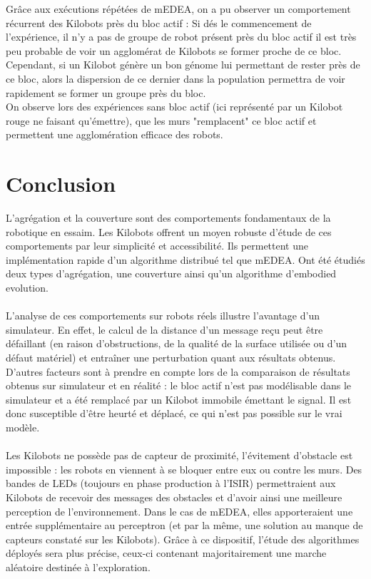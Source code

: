 \documentclass[a4paper]{article}
\begin{document}
Grâce aux exécutions répétées de mEDEA, on a pu observer un comportement récurrent des Kilobots près du bloc actif : Si dés le commencement de l'expérience, il n'y a pas de groupe de robot présent près du bloc actif  il est très peu probable de voir un agglomérat de Kilobots se former proche de ce bloc. Cependant, si un Kilobot génère un bon génome lui permettant de rester près de ce bloc, alors la dispersion de ce dernier dans la population permettra de voir rapidement se former un groupe près du bloc.\\
On observe lors des expériences sans bloc actif (ici représenté par un Kilobot rouge ne faisant qu'émettre), que les murs "remplacent" ce bloc actif et permettent une agglomération efficace des robots.
\newpage
\section{Conclusion}
L’agrégation et la couverture sont des comportements fondamentaux de la robotique en essaim. Les Kilobots offrent un moyen robuste d’étude de ces comportements par leur simplicité et accessibilité. Ils permettent une implémentation rapide d’un algorithme distribué tel que mEDEA. Ont été étudiés deux types d’agrégation, une couverture ainsi qu’un algorithme d’embodied evolution.
\\ \\
L’analyse de ces comportements sur robots réels illustre l’avantage d’un simulateur. En effet, le calcul de la distance d’un message reçu peut être défaillant (en raison d’obstructions, de la qualité de la surface utilisée ou d’un défaut matériel) et entraîner une perturbation quant aux résultats obtenus. D’autres facteurs sont à prendre en compte lors de la comparaison de résultats obtenus sur simulateur et en réalité : le bloc actif n’est pas modélisable dans le simulateur et a été remplacé par un Kilobot immobile émettant le signal. Il est donc susceptible d’être heurté et déplacé, ce qui n’est pas possible sur le vrai modèle.
\\ \\
Les Kilobots ne possède pas de capteur de proximité, l’évitement d’obstacle est impossible : les robots en viennent à se bloquer entre eux ou contre les murs. Des bandes de LEDs (toujours en phase production à l’ISIR) permettraient aux Kilobots de recevoir des messages des obstacles et d'avoir ainsi une meilleure perception de l’environnement. Dans le cas de mEDEA, elles apporteraient une entrée supplémentaire au perceptron (et par la même, une solution au manque de capteurs constaté sur les Kilobots). Grâce à ce dispositif, l’étude des algorithmes déployés sera plus précise, ceux-ci contenant majoritairement une marche aléatoire destinée à l’exploration. 
\end{document}
